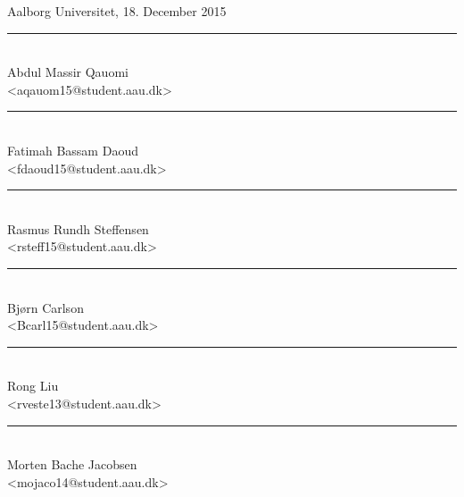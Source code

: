 \vspace{\baselineskip}\hfill Aalborg Universitet, 18. December 2015
\vfill

\noindent

\begin{minipage}[b]{0.45\textwidth}
	\centering
	\rule{\textwidth}{0.5pt}\\
	Abdul Massir Qauomi\\
	{\footnotesize <aqauom15@student.aau.dk>}
\end{minipage}
%
\hfill
%
\begin{minipage}[b]{0.45\textwidth}
	\centering
	\rule{\textwidth}{0.5pt}\\
	Fatimah Bassam Daoud\\
	{\footnotesize <fdaoud15@student.aau.dk>}
\end{minipage}
%
\vspace{3\baselineskip}

\noindent
\begin{minipage}[b]{0.45\textwidth}
	\centering
	\rule{\textwidth}{0.5pt}\\
	Rasmus Rundh Steffensen\\
	{\footnotesize <rsteff15@student.aau.dk>}
\end{minipage}
%
\hfill
%
\begin{minipage}[b]{0.45\textwidth}
	\centering
	\rule{\textwidth}{0.5pt}\\
	Bjørn Carlson\\
	{\footnotesize <Bcarl15@student.aau.dk>}
\end{minipage}
\vspace{3\baselineskip}

\noindent
\begin{minipage}[b]{0.45\textwidth}
	\centering
	\rule{\textwidth}{0.5pt}\\
	Rong Liu\\
	{\footnotesize <rveste13@student.aau.dk>}
\end{minipage}
%
\hfill
%
\begin{minipage}[b]{0.45\textwidth}
	\centering
	\rule{\textwidth}{0.5pt}\\
	Morten Bache Jacobsen\\
	{\footnotesize <mojaco14@student.aau.dk>}
\end{minipage}
\vspace{3\baselineskip}
